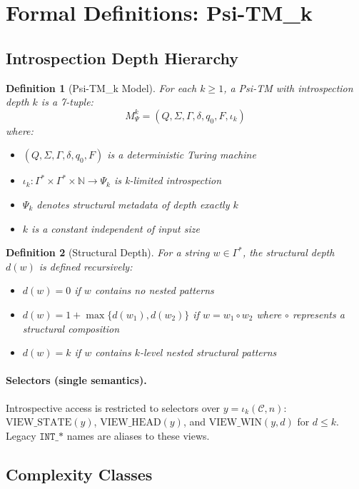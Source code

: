 \documentclass[11pt]{article}
\newtheorem{definition}{Definition}
\begin{document}
\section{Formal Definitions: Psi-TM_k}

\subsection{Introspection Depth Hierarchy}

\begin{definition}[Psi-TM_k Model]
For each $k \geq 1$, a Psi-TM with introspection depth $k$ is a 7-tuple:
$$M_\Psi^k = (Q, \Sigma, \Gamma, \delta, q_0, F, \iota_k)$$
where:
\begin{itemize}
\item $(Q, \Sigma, \Gamma, \delta, q_0, F)$ is a deterministic Turing machine
\item $\iota_k: \Gamma^* \times \Gamma^* \times \mathbb{N} \to \Psi_k$ is k-limited introspection
\item $\Psi_k$ denotes structural metadata of depth exactly $k$
\item $k$ is a constant independent of input size
\end{itemize}
\end{definition}

\begin{definition}[Structural Depth]
For a string $w \in \Gamma^*$, the structural depth $d(w)$ is defined recursively:
\begin{itemize}
\item $d(w) = 0$ if $w$ contains no nested patterns
\item $d(w) = 1 + \max\{d(w_1), d(w_2)\}$ if $w = w_1 \circ w_2$ where $\circ$ represents a structural composition
\item $d(w) = k$ if $w$ contains $k$-level nested structural patterns
\end{itemize}
\end{definition}

\paragraph{Selectors (single semantics).} Introspective access is restricted to selectors over $y=\iota_k(\mathcal{C},n)$: $\mathrm{VIEW\_STATE}(y)$, $\mathrm{VIEW\_HEAD}(y)$, and $\mathrm{VIEW\_WIN}(y,d)$ for $d\le k$. Legacy $\texttt{INT\_*}$ names are aliases to these views.

\subsection{Complexity Classes}
\end{document}
